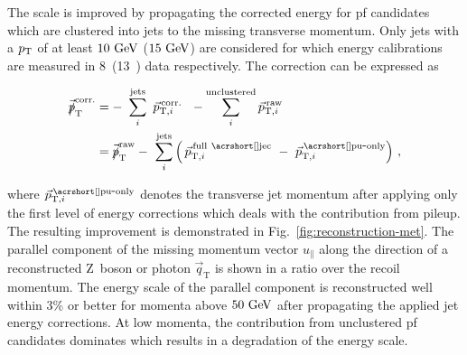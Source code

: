 The \met scale is improved by propagating the corrected energy for \gls{pf} candidates which are clustered into jets to the missing transverse momentum. Only jets with a $p_\textrm{T}$ of at least $10~\textrm{GeV}$ ($15~\textrm{GeV}$) are considered for which energy calibrations are measured in 8~\TeV (13~\TeV) data respectively. The correction can be expressed as

\begin{subequations}
\begin{align}
\pvmiss^\mathrm{corr.}&=-~\sum_{i}^\mathrm{jets}~\vec{p}_{\mathrm{T},i}^\mathrm{\,corr.}~~-\sum_{i}^\mathrm{unclustered}\vec{p}_{\mathrm{T},i}^\mathrm{\,raw}\\
&=\pvmiss^\mathrm{raw}-~\sum_{i}^\mathrm{jets}\left(\, \vec{p}_{\mathrm{T},i}^\mathrm{\,full~\gls{jec}}~-~\vec{p}_{\mathrm{T},i}^\mathrm{\,\gls{pu}\mbox{-}only}\right)\,,
\end{align}
\end{subequations}

where $\vec{p}_{\mathrm{T},i}^\scriptn{\mathrm{\,\gls{pu}\mbox{-}only}}$ denotes the transverse jet momentum after applying only the first level of energy corrections which deals with the contribution from pileup. The resulting improvement is demonstrated in Fig.~\ref{fig:reconstruction-met}. The parallel component of the missing momentum vector $u_{\parallel}$ along the direction of a reconstructed $\mathrm{Z}$~boson or photon $\vec{q}_\mathrm{T}$ is shown in a ratio over the recoil momentum. The energy scale of the parallel \pvmiss component is reconstructed well within 3\% or better for momenta above $50~\textrm{GeV}$ after propagating the applied jet energy corrections. At low momenta, the contribution from unclustered \gls{pf} candidates dominates which results in a degradation of the energy scale.


